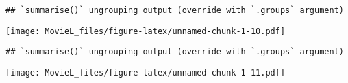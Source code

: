 \documentclass[
]{article}
\newenvironment{Shaded}{\begin{snugshade}}{\end{snugshade}}
\newcommand{\DataTypeTok}[1]{\textcolor[rgb]{0.13,0.29,0.53}{#1}}
\newcommand{\DecValTok}[1]{\textcolor[rgb]{0.00,0.00,0.81}{#1}}
\newcommand{\KeywordTok}[1]{\textcolor[rgb]{0.13,0.29,0.53}{\textbf{#1}}}
\newcommand{\NormalTok}[1]{#1}
\newcommand{\OperatorTok}[1]{\textcolor[rgb]{0.81,0.36,0.00}{\textbf{#1}}}
\newcommand{\OtherTok}[1]{\textcolor[rgb]{0.56,0.35,0.01}{#1}}
\newcommand{\StringTok}[1]{\textcolor[rgb]{0.31,0.60,0.02}{#1}}
\begin{document}
\begin{verbatim}
## `summarise()` ungrouping output (override with `.groups` argument)
\end{verbatim}

\texttt{[image: MovieL\_files/figure-latex/unnamed-chunk-1-10.pdf]}

\begin{Shaded}
\end{Shaded}

\begin{verbatim}
## `summarise()` ungrouping output (override with `.groups` argument)
\end{verbatim}

\texttt{[image: MovieL\_files/figure-latex/unnamed-chunk-1-11.pdf]}
\end{document}
